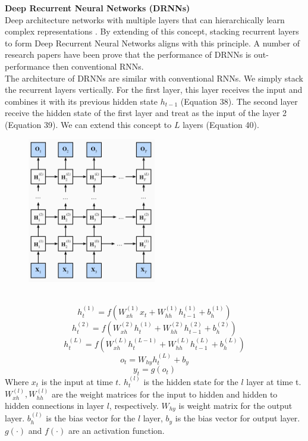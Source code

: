 \documentclass[12pt,a4paper]{article}
\begin{document}
\textbf{Deep Recurrent Neural Networks (DRNNs)}
\\[1ex]
Deep architecture networks with multiple layers that can hierarchically learn complex representations \parencite{bengio2009learning}. By extending of this concept, stacking recurrent layers to form Deep Recurrent Neural Networks aligns with this principle. A number of research papers have been prove that the performance of DRNNs is out-performance then conventional RNNs. \parencite{le2010deep, delalleau2011shallow, pascanu2013on}
\\[1ex]
The architecture of DRNNs are similar with conventional RNNs. We simply stack the recurrent layers vertically. For the first layer, this layer receives the input and combines it with its previous hidden state $h_{t-1}$ (Equation 38). The second layer receive the hidden state of the first layer and treat as the input of the layer 2 (Equation 39). We can extend this concept to $L$ layers (Equation 40).
\begin{figure}[!htb]
    \centering
    \includegraphics[width=0.5\textwidth]{../Pic/drnn.png} %
\end{figure}
\\[1ex]
\begin{equation}
    h^{(1)}_t = f(W^{(1)}_{xh} x_{t} + W^{(1)}_{hh} h^{(1)}_{t-1} + b^{(1)}_h)
\end{equation}
\begin{equation}
    h^{(2)}_t = f(W^{(2)}_{xh} h^{(1)}_{t} + W^{(2)}_{hh} h^{(2)}_{t-1} + b^{(2)}_h)
\end{equation}
\begin{equation}
    h^{(L)}_t = f(W^{(L)}_{xh} h^{(L-1)}_{t} + W^{(L)}_{hh} h^{(L)}_{t-1} + b^{(L)}_h)
\end{equation}
\begin{equation}
    o_t = W_{hy}h^{(L)}_{t} + b_y
\end{equation}
\begin{equation}
    y_t = g(o_t)
\end{equation}
Where $x_t$ is the input at time $t$. $h^{(l)}_{t}$ is the hidden state for the $l$ layer at time t. $W^{(l)}_{xh}, W^{(l)}_{hh}$ are the weight matrices for the input to hidden and hidden to hidden connections in layer $l$, respectively. $W_{hy}$ is weight matrix for the output layer. $b^{(l)}_h$ is the bias vector for the $l$ layer, $b_y$ is the bias vector for output layer. $g(\cdot)$ and $f(\cdot)$ are an activation function. 
\end{document}
